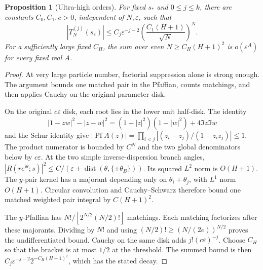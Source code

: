 \documentclass[11pt]{article}
\numberwithin{equation}{section}
\newtheorem{proposition}[theorem]{Proposition}
\theoremstyle{definition}
\newcommand{\ii}{\mathrm i}
\newcommand{\eps}{\varepsilon}
\newcommand{\Pf}{\operatorname{Pf}}
\newcommand{\dist}{\operatorname{dist}}
\newcommand{\sstar}{s_*}
\newcommand{\se}{s_\varepsilon}
\begin{document}
\begin{proposition}[Ultra-high orders]\label{prop:ultrahigh}
For fixed \(\sstar\) and \(0\le j\le k\), there are constants
\(C_0,C_1,c>0\), independent of \(N,\eps\), such that
\[
 |T_N^{(j)}(\se)|
 \le C_j\eps^{-j-2}\left(\frac{C_1(H+1)}{\sqrt N}\right)^N.
\]
For a sufficiently large fixed \(C_H\),
the sum over even \(N\ge C_H(H+1)^2\) is \(o(\eps^A)\)
for every fixed real \(A\).
\end{proposition}
\begin{proof}
At very large particle number, factorial suppression alone is strong enough. The argument bounds one matched pair in the Pfaffian, counts matchings, and then applies Cauchy on the original parameter disk.

On the original \(c\eps\) disk, each root lies in the lower unit
half-disk. The identity
\[
 |1-zw|^2-|z-w|^2=(1-|z|^2)(1-|w|^2)+4\Im z\Im w
\]
and the Schur identity give
\(|\Pf A(z)|=\prod_{i<j}|(z_i-z_j)/(1-z_iz_j)|\le1\).
The product numerator is bounded by \(C^N\) and the two global
denominators below by \(c\eps\).
At the two simple inverse-dispersion branch angles,
\(|R(re^{\ii\theta};s)|^2\le C/(\eps+\dist(\theta,\{\pm\theta_B\}))\).
Its squared \(L^2\) norm is \(O(H+1)\). The \(y\)-pair kernel has a
majorant depending only on \(\theta_i+\theta_j\), with \(L^1\) norm
\(O(H+1)\). Circular convolution and Cauchy--Schwarz therefore bound
one matched weighted pair integral by \(C(H+1)^2\).

The \(y\)-Pfaffian has \(N!/[2^{N/2}(N/2)!]\) matchings.
Each matching factorizes after these majorants. Dividing by \(N!\)
and using \((N/2)!\ge(N/(2e))^{N/2}\) proves the undifferentiated
bound. Cauchy on the same disk adds \(j!(c\eps)^{-j}\).
Choose \(C_H\) so that the bracket is at most \(1/2\) at the threshold.
The summed bound is then
\(C_j\eps^{-j-2}2^{-C_H(H+1)^2}\), which has the stated decay.
\end{proof}
\end{document}
